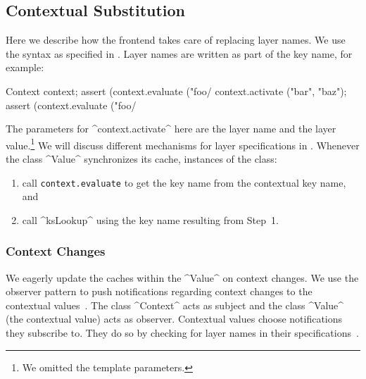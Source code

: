 \subsection{Contextual Substitution}

Here we describe how the frontend takes care of replacing layer names.
We use the syntax as specified in .
Layer names are written as part of the key name, for example:

Context context;
assert (context.evaluate ("foo/%
context.activate ("bar", "baz");
assert (context.evaluate ("foo/%
\end{code}

The parameters for ^context.activate^ here are the layer name and the layer value.\footnote{We omitted the template parameters.}
We will discuss different mechanisms for layer specifications in .
Whenever the class ^Value^ synchronizes its cache, instances of the class:
\begin{enumerate}
\item call \texttt{context.evaluate} to get the key name from the contextual key name, and
\item call ^ksLookup^ using the key name resulting from Step~1.
\end{enumerate}

\subsubsection{Context Changes}

\label{sec:observer}
We eagerly update the caches within the ^Value^ on context changes.
We use the observer pattern to push notifications regarding context changes to the contextual values~\cite{gamma1994design}.
The class ^Context^ acts as subject and the class ^Value^ (the contextual value) acts as observer.
Contextual values choose notifications they subscribe to.
They do so by checking for layer names in their specifications~\cite{raab2014program}.

